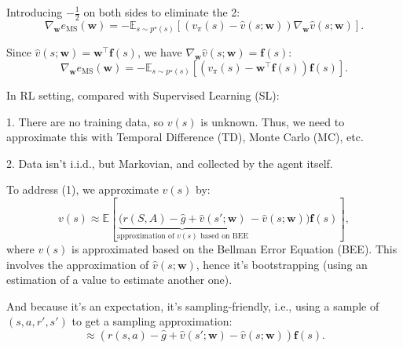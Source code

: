 Introducing \(-\frac{1}{2}\) on both sides to eliminate the 2:
\[
\nabla_{\mathbf{w}} e_{\text{MS}}(\mathbf{w}) = - \mathbb{E}_{s \sim p^\star(s)}\left[\left(v_\pi(s) - \hat{v}(s;\mathbf{w})\right) \nabla_{\mathbf{w}} \hat{v}(s;\mathbf{w})\right].
\]

Since \(\hat{v}(s;\mathbf{w}) = \mathbf{w}^\top \mathbf{f}(s)\), we have \(\nabla_{\mathbf{w}} \hat{v}(s;\mathbf{w}) = \mathbf{f}(s)\):
\[
\nabla_{\mathbf{w}} e_{\text{MS}}(\mathbf{w}) = - \mathbb{E}_{s \sim p^\star(s)}\left[\left(v_\pi(s) - \mathbf{w}^\top \mathbf{f}(s)\right) \mathbf{f}(s)\right].
\]

In RL setting, compared with Supervised Learning (SL):

1. There are no training data, so \(v(s)\) is unknown. Thus, we need to approximate this with Temporal Difference (TD), Monte Carlo (MC), etc.

2. Data isn't i.i.d., but Markovian, and collected by the agent itself.

To address (1), we approximate \(v(s)\) by:
\[
v(s) \approx \mathbb{E}\left[\underbrace{(r(S, A) - \hat{g} + \hat{v}(s'; \mathbf{w})}_{\text{approximation of } v(s) \text{ based on BEE}} - \hat{v}(s; \mathbf{w})) \mathbf{f}(s)\right],
\]
where \(v(s)\) is approximated based on the Bellman Error Equation (BEE). This involves the approximation of \(\hat{v}(s; \mathbf{w})\), hence it's bootstrapping (using an estimation of a value to estimate another one).

And because it's an expectation, it's sampling-friendly, i.e., using a sample of \((s, a, r', s')\) to get a sampling approximation:
\[
    \approx \left(r(s, a) - \hat{g} + \hat{v}(s'; \mathbf{w}) - \hat{v}(s; \mathbf{w})\right) \mathbf{f}(s).
\]